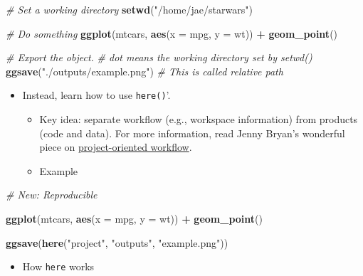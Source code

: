 \documentclass[
]{book}
\newenvironment{Shaded}{\begin{snugshade}}{\end{snugshade}}
\newcommand{\CommentTok}[1]{\textcolor[rgb]{0.56,0.35,0.01}{\textit{#1}}}
\newcommand{\DataTypeTok}[1]{\textcolor[rgb]{0.13,0.29,0.53}{#1}}
\newcommand{\KeywordTok}[1]{\textcolor[rgb]{0.13,0.29,0.53}{\textbf{#1}}}
\newcommand{\NormalTok}[1]{#1}
\newcommand{\OperatorTok}[1]{\textcolor[rgb]{0.81,0.36,0.00}{\textbf{#1}}}
\newcommand{\StringTok}[1]{\textcolor[rgb]{0.31,0.60,0.02}{#1}}
\providecommand{\tightlist}{%
  \setlength{\itemsep}{0pt}\setlength{\parskip}{0pt}}
\begin{document}
\begin{Shaded}
\begin{Highlighting}[]
\CommentTok{\# Set a working directory }
\KeywordTok{setwd}\NormalTok{(}\StringTok{"/home/jae/starwars"}\NormalTok{)}

\CommentTok{\# Do something }
\KeywordTok{ggplot}\NormalTok{(mtcars, }\KeywordTok{aes}\NormalTok{(}\DataTypeTok{x =}\NormalTok{ mpg, }\DataTypeTok{y =}\NormalTok{ wt)) }\OperatorTok{+}
\StringTok{   }\KeywordTok{geom\_point}\NormalTok{()}

\CommentTok{\# Export the object. }
\CommentTok{\# dot means the working directory set by setwd()}
\KeywordTok{ggsave}\NormalTok{(}\StringTok{"./outputs/example.png"}\NormalTok{) }\CommentTok{\# This is called relative path }
\end{Highlighting}
\end{Shaded}

\begin{itemize}
\item
  Instead, learn how to use \texttt{here()}'.

  \begin{itemize}
  \item
    Key idea: separate workflow (e.g., workspace information) from products (code and data). For more information, read Jenny Bryan's wonderful piece on \href{https://www.tidyverse.org/blog/2017/12/workflow-vs-script/}{project-oriented workflow}.
  \item
    Example
  \end{itemize}
\end{itemize}

\begin{Shaded}
\begin{Highlighting}[]
\CommentTok{\# New: Reproducible }

\KeywordTok{ggplot}\NormalTok{(mtcars, }\KeywordTok{aes}\NormalTok{(}\DataTypeTok{x =}\NormalTok{ mpg, }\DataTypeTok{y =}\NormalTok{ wt)) }\OperatorTok{+}
\StringTok{   }\KeywordTok{geom\_point}\NormalTok{()}

\KeywordTok{ggsave}\NormalTok{(}\KeywordTok{here}\NormalTok{(}\StringTok{"project"}\NormalTok{, }\StringTok{"outputs"}\NormalTok{, }\StringTok{"example.png"}\NormalTok{))}
\end{Highlighting}
\end{Shaded}

\begin{itemize}
\tightlist
\item
  How \texttt{here} works
\end{itemize}
\end{document}
